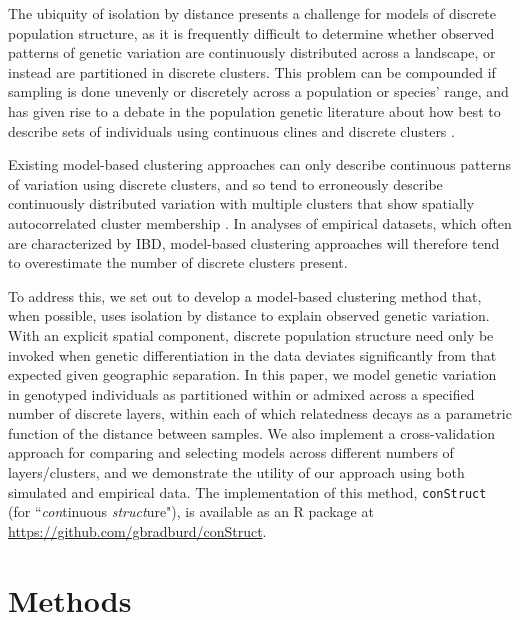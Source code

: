 \documentclass[12pt]{article}
\begin{document}
The ubiquity of isolation by distance presents a challenge for models of discrete population structure,
as it is frequently difficult to determine whether observed patterns of genetic variation are 
continuously distributed across a landscape, or instead are partitioned in discrete clusters.
This problem can be compounded if sampling is done unevenly or discretely across a population or species' range,
and has given rise to a debate in the population genetic literature
about how best to describe sets of individuals using continuous clines and discrete clusters 
\citep[e.g.][]{SerrePaabo2004,rosenberg2005clines}.

Existing model-based clustering approaches can only describe continuous patterns of variation using
discrete clusters, and so tend to erroneously describe continuously distributed variation with multiple clusters that 
show spatially autocorrelated cluster membership \citep{Frantz2009,meirmans2012}.
In analyses of empirical datasets, which often are characterized by IBD,
model-based clustering approaches will therefore tend to overestimate
the number of discrete clusters present. 

To address this, we set out to develop
a model-based clustering method that, when possible, uses isolation by distance 
to explain observed genetic variation.
With an explicit spatial component, discrete population structure need only be invoked when genetic differentiation 
in the data deviates significantly from that expected given geographic separation.
In this paper, 
we model genetic variation in genotyped individuals as 
partitioned within or admixed across a specified number of discrete layers,
within each of which relatedness decays as a parametric function of the distance between samples.
We also implement a cross-validation approach for comparing and selecting models across different numbers of layers/clusters,
and we demonstrate the utility of our approach using both simulated and empirical data.
The implementation of this method, \texttt{conStruct} (for ``\emph{con}tinuous \emph{struct}ure"), 
is available as an R package at 
\href{https://github.com/gbradburd/conStruct}{https://github.com/gbradburd/conStruct}.

\section*{Methods}
\end{document}
